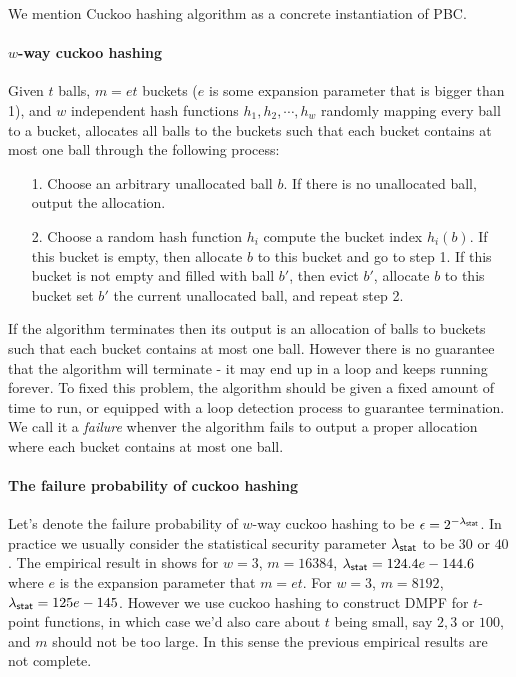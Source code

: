 We mention Cuckoo hashing algorithm\cite{10.1007/3-540-44676-1_10} as a concrete instantiation of PBC\cite{cryptoeprint:2017/1142}.

\paragraph{$w$-way cuckoo hashing}Given $t$ balls, $m=et$ buckets ($e$ is some expansion parameter that is bigger than 1), and $w$ independent hash functions $h_1, h_2,\cdots, h_w$ randomly mapping every ball to a bucket, allocates all balls to the buckets such that each bucket contains at most one ball through the following process: 
\begin{itemize}
  \item[1.] Choose an arbitrary unallocated ball $b$. If there is no unallocated ball, output the allocation. 
  \item[2.] Choose a random hash function $h_i$ compute the bucket index $h_i(b)$. If this bucket is empty, then allocate $b$ to this bucket and go to step 1. If this bucket is not empty and filled with ball $b'$, then evict $b'$, allocate $b$ to this bucket set $b'$ the current unallocated ball, and repeat step 2. 
\end{itemize}
If the algorithm terminates then its output is an allocation of balls to buckets such that each bucket contains at most one ball. However there is no guarantee that the algorithm will terminate - it may end up in a loop and keeps running forever. To fixed this problem, the algorithm should be given a fixed amount of time to run, or equipped with a loop detection process to guarantee termination. We call it a \emph{failure} whenver the algorithm fails to output a proper allocation where each bucket contains at most one ball. 


\paragraph{The failure probability of cuckoo hashing}Let's denote the failure probability of $w$-way cuckoo hashing to be $\epsilon=2^{-\lambda_{{\sf stat}}}$. In practice we usually consider the statistical security parameter $\lambda_{{\sf stat}}$ to be $30$ or $40$. The empirical result in \cite{chen_fast_2017} shows for $w=3$, $m=16384$, $\lambda_{\sf stat} = 124.4e-144.6$ where $e$ is the expansion parameter that $m=et$. For $w=3$, $m=8192$, $\lambda_{\sf stat}=125e-145$. However we use cuckoo hashing to construct DMPF for $t$-point functions, in which case we'd also care about $t$ being small, say $2,3$ or $100$, and $m$ should not be too large. In this sense the previous empirical results are not complete. 

